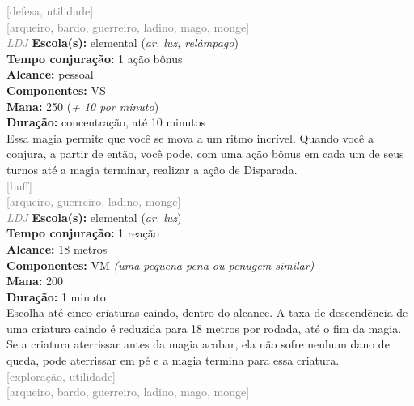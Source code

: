 \documentclass{RPG_Adventure}[2021/10/20]
\begin{document}
{\scriptsize \textcolor{gray}{[defesa, utilidade]\\}}
{\scriptsize \textcolor{gray}{[arqueiro, bardo, guerreiro, ladino, mago, monge]\\}}
{\tiny \textcolor{gray}{\textit{LDJ}}}\jump{}
{\small \t \textbf{Escola(s):} elemental (\textit{ar, luz, relâmpago})\\\t \textbf{Tempo conjuração:} 1 ação bônus\\\t \textbf{Alcance:} pessoal\\\t \textbf{Componentes:} VS\\\t \textbf{Mana:} 250 (\textit{+ 10 por minuto})\\\t \textbf{Duração:} concentração, até 10 minutos\\}
{\normalsize Essa magia permite que você se mova a um ritmo incrível. Quando você a conjura, a partir de então, você pode, com uma ação bônus em cada um de seus turnos até a magia terminar, realizar a ação de Disparada.\\}
{\scriptsize \textcolor{gray}{[buff]\\}}
{\scriptsize \textcolor{gray}{[arqueiro, guerreiro, ladino, monge]\\}}
{\tiny \textcolor{gray}{\textit{LDJ}}}\jump{}
{\small \t \textbf{Escola(s):} elemental (\textit{ar, luz})\\\t \textbf{Tempo conjuração:} 1 reação\\\t \textbf{Alcance:} 18 metros\\\t \textbf{Componentes:} VM \textit{(uma pequena pena ou penugem similar)}\\\t \textbf{Mana:} 200\\\t \textbf{Duração:} 1 minuto\\}
{\normalsize Escolha até cinco criaturas caindo, dentro do alcance. A taxa de descendência de uma criatura caindo é reduzida para 18 metros por rodada, até o fim da magia. Se a criatura aterrissar antes da magia acabar, ela não sofre nenhum dano de queda, pode aterrissar em pé e a magia termina para essa criatura.\\}
{\scriptsize \textcolor{gray}{[exploração, utilidade]\\}}
{\scriptsize \textcolor{gray}{[arqueiro, bardo, guerreiro, ladino, mago, monge]\\}}
\end{document}
